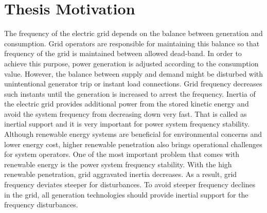 \section{Thesis Motivation}
The frequency of the electric grid depends on the balance between generation and consumption. Grid operators are responsible for maintaining this balance so that frequency of the grid is maintained between allowed dead-band. In order to achieve this purpose, power generation is adjusted according to the consumption value. However, the balance between supply and demand might be disturbed with unintentional generator trip or instant load connections. Grid frequency decreases such instants until the generation is increased to arrest the frequency. Inertia of the electric grid provides additional power from the stored kinetic energy and avoid the system frequency from decreasing down very fast. That is called as inertial support and it is very important for power system frequency stability.\\

Although renewable energy systems are beneficial for environmental concerns and lower energy cost, higher renewable penetration also brings operational challenges for system operators. One of the most important problem that comes with renewable energy is the power system frequency stability. With the high renewable penetration, grid aggravated inertia decreases. As a result, grid frequency deviates steeper for disturbances. To avoid steeper frequency declines in the grid, all generation technologies should provide inertial support for the frequency disturbances.



















